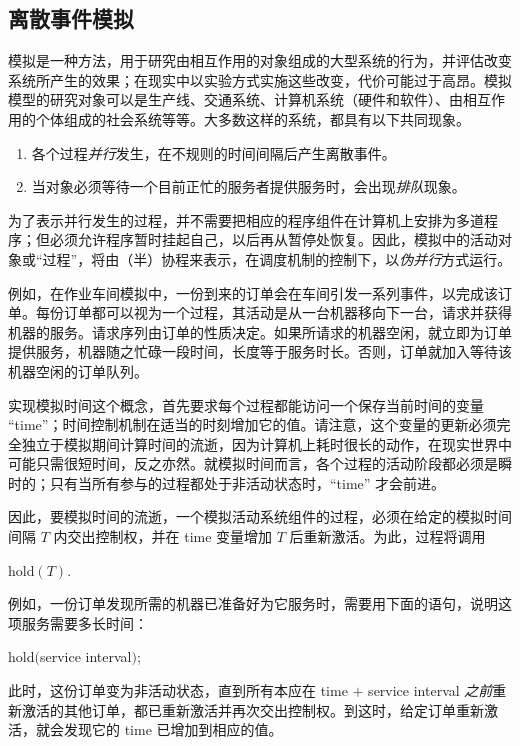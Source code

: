 \documentclass[twoside,11pt,fontset=none]{ctexbook}
\begin{document}
\subsection{离散事件模拟}

模拟是一种方法，用于研究由相互作用的对象组成的大型系统的行为，并评估改变系统所产生的效果；在现实中以实验方式实施这些改变，代价可能过于高昂。模拟模型的研究对象可以是生产线、交通系统、计算机系统（硬件和软件）、由相互作用的个体组成的社会系统等等。大多数这样的系统，都具有以下共同现象。

\begin{enumerate}[wide, nosep, label=(\arabic*)]
	\item 各个过程\textit{并行}发生，在不规则的时间间隔后产生离散事件。
	\item 当对象必须等待一个目前正忙的服务者提供服务时，会出现\textit{排队}现象。
\end{enumerate}

为了表示并行发生的过程，并不需要把相应的程序组件在计算机上安排为多道程序；但必须允许程序暂时挂起自己，以后再从暂停处恢复。因此，模拟中的活动对象或“过程”，将由（半）协程来表示，在调度机制的控制下，以\textit{伪并行}方式运行。

例如，在作业车间模拟中，一份到来的订单会在车间引发一系列事件，以完成该订单。每份订单都可以视为一个过程，其活动是从一台机器移向下一台，请求并获得机器的服务。请求序列由订单的性质决定。如果所请求的机器空闲，就立即为订单提供服务，机器随之忙碌一段时间，长度等于服务时长。否则，订单就加入等待该机器空闲的订单队列。

实现模拟时间这个概念，首先要求每个过程都能访问一个保存当前时间的变量 ``time''；时间控制机制在适当的时刻增加它的值。请注意，这个变量的更新必须完全独立于模拟期间计算时间的流逝，因为计算机上耗时很长的动作，在现实世界中可能只需很短时间，反之亦然。就模拟时间而言，各个过程的活动阶段都必须是瞬时的；只有当所有参与的过程都处于非活动状态时，``time'' 才会前进。

因此，要模拟时间的流逝，一个模拟活动系统组件的过程，必须在给定的模拟时间间隔 $T$ 内交出控制权，并在 time 变量增加 $T$ 后重新激活。为此，过程将调用

\quad hold$(T)$.

例如，一份订单发现所需的机器已准备好为它服务时，需要用下面的语句，说明这项服务需要多长时间：

\quad hold$($service interval$)$;

\noindent
此时，这份订单变为非活动状态，直到所有本应在 time $+$ service interval \textit{之前}重新激活的其他订单，都已重新激活并再次交出控制权。到这时，给定订单重新激活，就会发现它的 time 已增加到相应的值。
\end{document}
